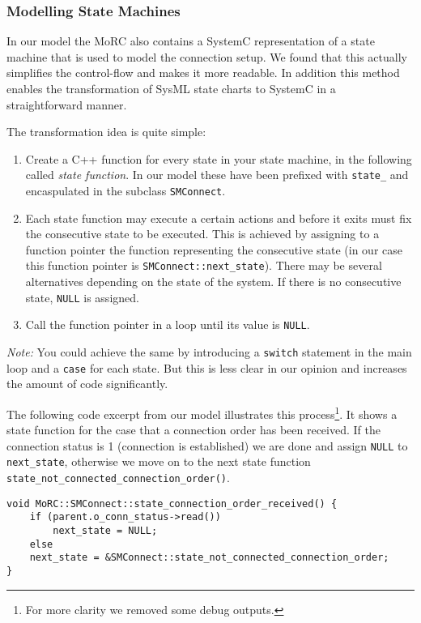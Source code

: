 \documentclass{template/openetcs_article}
\begin{document}
\subsubsection{Modelling State Machines}
\label{sct:modellingsm}

In our model the MoRC also contains a SystemC representation of a state machine that is used to model the connection setup. We found that this actually simplifies the control-flow and makes it more readable. In addition this method enables the transformation of SysML state charts to SystemC in a straightforward manner.

The transformation idea is quite simple: 
\begin{enumerate}
  \item Create a C++ function for every state in your state machine, in the following called \emph{state function}. In our model these have been prefixed with \verb|state_| and encaspulated in the subclass \verb|SMConnect|.
  \item Each state function may execute a certain actions and before it exits must fix the consecutive state to be executed. This is achieved by assigning to a function pointer the function representing the consecutive state (in our case this function pointer is \verb|SMConnect::next_state|). There may be several alternatives depending on the state of the system. If there is no consecutive state, \verb|NULL| is assigned.
  \item Call the function pointer in a loop until its value is \verb|NULL|. 
\end{enumerate}

\emph{Note:} You could achieve the same by introducing a \verb|switch| statement in the main loop and a \verb|case| for each state. But this is less clear in our opinion and increases the amount of code significantly.

The following code excerpt from our model illustrates this process\footnote{For more clarity we removed some debug outputs.}. It shows a state function for the case that a connection order has been received. If the connection status is 1 (connection is established) we are done and assign \verb|NULL| to \verb|next_state|, otherwise we move on to the next state function \verb|state_not_connected_connection_order()|.

{\small
\begin{lstlisting}
void MoRC::SMConnect::state_connection_order_received() {
    if (parent.o_conn_status->read())
        next_state = NULL;
    else 
	next_state = &SMConnect::state_not_connected_connection_order;
}
\end{lstlisting}}
\end{document}
